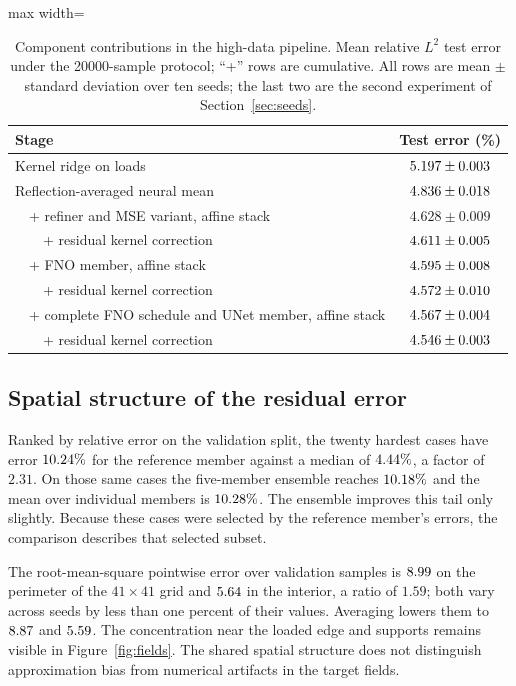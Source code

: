 \begin{table}[t]
\centering
\caption{Component contributions in the high-data pipeline. Mean relative $L^2$ test error under
the 20000-sample protocol; ``+'' rows are cumulative. All rows are mean $\pm$
standard deviation over ten seeds; the last two are the second experiment of
Section~\ref{sec:seeds}.}
\label{tab:ablation}
\begin{adjustbox}{max width=\linewidth}
\begin{tabular}{lc}
\toprule
Stage & Test error (\%) \\
\midrule
Kernel ridge on loads & $5.197\pm0.003$ \\
Reflection-averaged neural mean & $4.836\pm0.018$ \\
\ \ + refiner and MSE variant, affine stack & $4.628\pm0.009$ \\
\ \ \ \ + residual kernel correction & $4.611\pm0.005$ \\
\ \ + FNO member, affine stack & $4.595\pm0.008$ \\
\ \ \ \ + residual kernel correction & $4.572\pm0.010$ \\
\ \ + complete FNO schedule and UNet member, affine stack & $4.567\pm0.004$ \\
\ \ \ \ + residual kernel correction & $4.546\pm0.003$ \\
\bottomrule
\end{tabular}
\end{adjustbox}
\end{table}


\subsection{Spatial structure of the residual error}
\label{sec:errors}

Ranked by relative error on the
validation split, the twenty hardest cases have error $10.24\%$ for the
reference member against a median of $4.44\%$, a factor of $2.31$.
On those same cases the five-member ensemble reaches $10.18\%$ and the
mean over individual members is $10.28\%$. The ensemble improves this tail
only slightly. Because these cases were selected by the reference member's
errors, the comparison describes that selected subset.

The root-mean-square pointwise error over validation samples is $8.99$ on
the perimeter of the $41\times41$ grid and $5.64$ in the interior, a ratio
of $1.59$; both vary across seeds by less than one percent of their values.
Averaging lowers them to $8.87$ and $5.59$. The concentration near
the loaded edge and supports remains visible in Figure~\ref{fig:fields}.
The shared spatial structure does not distinguish approximation bias from
numerical artifacts in the target fields.


